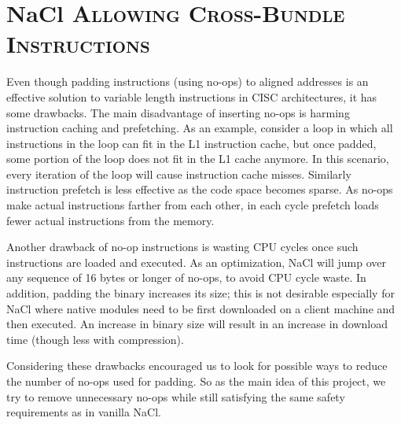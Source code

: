 \documentclass[conference]{IEEEtran}
\begin{document}
\section{\normalfont N\MakeLowercase{a}C\MakeLowercase{l} \scshape Allowing Cross-Bundle Instructions}
\label{cbi-nacl} 
Even though padding instructions (using no-ops) to aligned addresses is an effective solution to variable length instructions in CISC architectures, it has some drawbacks. The main disadvantage of inserting no-ops is harming instruction caching and prefetching. As an example, consider a loop in which all instructions in the loop can fit in the L1 instruction cache, but once padded, some portion of the loop does not fit in the L1 cache anymore. In this scenario, every iteration of the loop will cause instruction cache misses. Similarly instruction prefetch is less effective as the code space becomes sparse. As no-ops make actual instructions farther from each other, in each cycle prefetch loads fewer actual instructions from the memory. 

Another drawback of no-op instructions is wasting CPU cycles once such instructions are loaded and executed. As an optimization, NaCl will jump over any sequence of 16 bytes or longer of no-ops, to avoid CPU cycle waste. In addition, padding the binary increases its size; this is not desirable  especially  for NaCl where native modules need to be first downloaded on a client machine and then  executed. An increase in binary size will result in an increase in download time (though less with compression). 

Considering these drawbacks encouraged  us to look for possible ways to reduce the number of no-ops used for padding. So as the main idea of this project, we try to remove unnecessary no-ops while still satisfying the same safety requirements as in vanilla NaCl.
\end{document}
